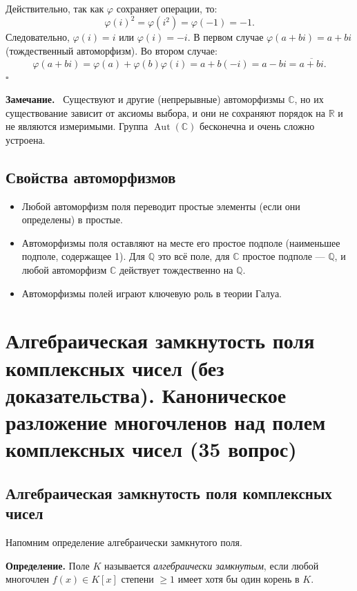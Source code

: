 \documentclass[a4paper,12pt]{article}
\newcommand{\myremark}{\textbf{Замечание.}\ }
\theoremstyle{definition}
\theoremstyle{plain}
\theoremstyle{remark}
\begin{document}
	Действительно, так как \( \varphi \) сохраняет операции, то:
	\[
	\varphi(i)^2 = \varphi(i^2) = \varphi(-1) = -1.
	\]
	Следовательно, \( \varphi(i) = i \) или \( \varphi(i) = -i \). В первом случае \( \varphi(a + bi) = a + bi \) (тождественный автоморфизм). Во втором случае:
	\[
	\varphi(a + bi) = \varphi(a) + \varphi(b)\varphi(i) = a + b(-i) = a - bi = \overline{a + bi}.
	\]
	\hfill \(\square\)
	
	\myremark
	Существуют и другие (непрерывные) автоморфизмы \( \mathbb{C} \), но их существование зависит от аксиомы выбора, и они не сохраняют порядок на \( \mathbb{R} \) и не являются измеримыми. Группа \( \operatorname{Aut}(\mathbb{C}) \) бесконечна и очень сложно устроена.
	
	\subsection{Свойства автоморфизмов}
	
	\begin{itemize}
		\item Любой автоморфизм поля переводит простые элементы (если они определены) в простые.
		\item Автоморфизмы поля оставляют на месте его простое подполе (наименьшее подполе, содержащее 1). Для \( \mathbb{Q} \) это всё поле, для \( \mathbb{C} \) простое подполе — \( \mathbb{Q} \), и любой автоморфизм \( \mathbb{C} \) действует тождественно на \( \mathbb{Q} \).
		\item Автоморфизмы полей играют ключевую роль в теории Галуа.
	\end{itemize}
	
	
	
	\newpage
	\section{Алгебраическая замкнутость поля комплексных чисел (без доказательства). Каноническое разложение многочленов над полем комплексных чисел (35 вопрос)}
	
	\subsection{Алгебраическая замкнутость поля комплексных чисел}
	
	Напомним определение алгебраически замкнутого поля.
	
	\medskip
	\noindent \textbf{Определение.} Поле \( K \) называется \textit{алгебраически замкнутым}, если любой многочлен \( f(x) \in K[x] \) степени \( \geq 1 \) имеет хотя бы один корень в \( K \).
	
\end{document}
